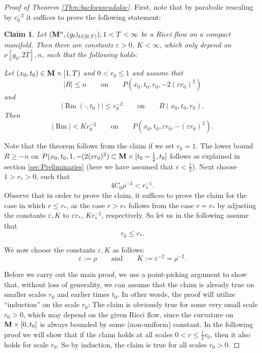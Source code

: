 \documentclass[11pt]{amsart}
\numberwithin{equation}{section}
\newtheorem*{claim}{Claim}
\def\M{{\bf M}}
\DeclareMathOperator{\Rm}{Rm}
\numberwithin{equation}{section}
\begin{document}
\begin{proof}[Proof of Theorem \ref{Thm:backwpseudoloc}]
First, note that by parabolic rescaling by $r_0^{-2}$ it suffices to prove the following statement:

\begin{claim}
Let $(\M^n, (g_t)_{t \in [0,T)}), 1 < T < \infty$ be a Ricci flow on a compact manifold.
Then there are constants $\varepsilon > 0$, $K < \infty$, which only depend on $\nu[g_0, 2T], n$, such that the following holds:

Let $(x_0, t_0) \in \M \times [1,T)$ and $0 < r_0 \leq 1$ and assume that
\[ |R| \leq n \qquad \text{on} \qquad P(x_0, t_0, r_0, - 2(\varepsilon r_0)^2) \]
and
\[ |{\Rm}(\cdot, t_0)| \leq r_0^{-2} \qquad \text{on} \qquad B(x_0, t_0, r_0). \]
Then
\[ |{\Rm}| < K r_0^{-2} \qquad \text{on} \qquad P(x_0, t_0, \varepsilon r_0, - (\varepsilon r_0)^2). \]
\end{claim}

Note that the theorem follows from the claim if we set $r_0 = 1$.
The lower bound $R \geq -n$ on $P(x_0, t_0, 1, - (2 (\varepsilon r_0)^2) \subset \M \times [t_0 - \frac12, t_0]$ follows as explained in section \ref{sec:Preliminaries} (here we have assumed that $\varepsilon < \frac12$).
Next choose $1 > r_* > 0$, such that
\begin{equation} \label{eq:choiceofr1}
4 C_0 \rho^{-3} <  r_*^{-1}.
\end{equation}
Observe that in order to prove the claim, it suffices to prove the claim for the case in which $r \leq r_*$, as the case $r > r_*$ follows from the case $r = r_*$ by adjusting the constants $\varepsilon, K$ to $\varepsilon r_*$, $K r_*^{-2}$, respectively.
So let us in the following assume that
\[ r_0 \leq r_*. \]

We now choose the constants $\varepsilon, K$ as follows:
\[  \varepsilon := \rho  \qquad \text{and} \qquad K := \varepsilon^{-2} =  \rho^{-2} .  \]

Before we carry out the main proof, we use a point-picking argument to show that, without loss of generality, we can assume that the claim is already true on smaller scales $r_0$ and earlier times $t_0$.
In other words, the proof will utilize ``induction'' on the scale $r_0$:
The claim is obviously true for some very small scale $r_0 > 0$, which may depend on the given Ricci flow, since the curvature on $\M \times [0,t_0]$ is always bounded by some (non-uniform) constant.
In the following proof we will show that if the claim holds at all scales $0 < r \leq \frac{1}2 r_0$, then it also holds for scale $r_0$.
So by induction, the claim is true for all scales $r_0 > 0$.


\end{proof}
\end{document}
